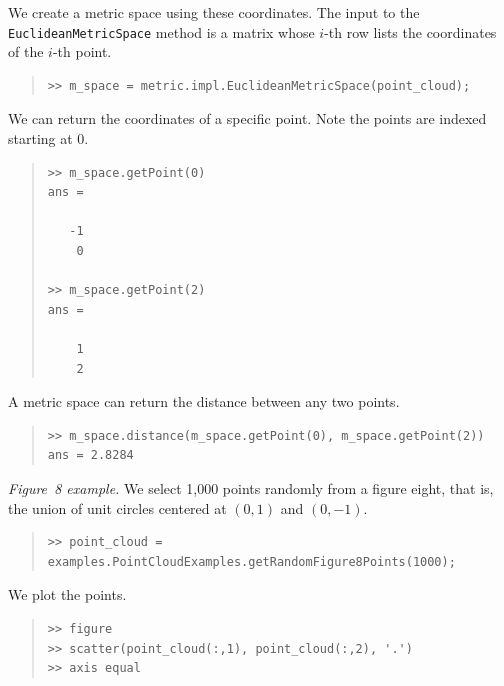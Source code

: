 \documentclass[amscd, amssymb, verbatim]{amsart}[12pt]
\theoremstyle{remark}
\theoremstyle{remark}
\theoremstyle{remark}
\begin{document}

We create a metric space using these coordinates. The input to the \texttt{EuclideanMetricSpace} method is a matrix whose $i$-th row lists the coordinates of the $i$-th point.

\begin{quote} \begin{verbatim}
>> m_space = metric.impl.EuclideanMetricSpace(point_cloud); 
\end{verbatim} \end{quote}

We can return the coordinates of a specific point. Note the points are indexed starting at 0.

\begin{quote} \begin{verbatim}
>> m_space.getPoint(0)
ans = 

   -1
    0
   
>> m_space.getPoint(2)
ans = 

    1
    2
\end{verbatim} \end{quote}

A metric space can return the distance between any two points.

\begin{quote} \begin{verbatim}
>> m_space.distance(m_space.getPoint(0), m_space.getPoint(2))
ans = 2.8284
\end{verbatim} \end{quote}

{\em Figure~8 example.} We select 1,000 points randomly from a figure eight, that is, the union of unit circles centered at $(0,1)$ and $(0,-1)$.

\begin{quote} \begin{verbatim}
>> point_cloud = examples.PointCloudExamples.getRandomFigure8Points(1000);
\end{verbatim} \end{quote}

We plot the points.

\begin{quote} \begin{verbatim}
>> figure
>> scatter(point_cloud(:,1), point_cloud(:,2), '.')
>> axis equal
\end{verbatim} \end{quote}
\end{document}
